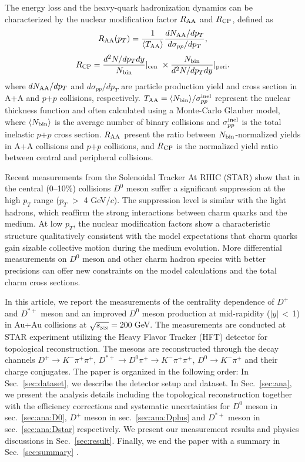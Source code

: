 \documentclass[%
 reprint,
 amsmath,amssymb,
 aps,
]{revtex4-1}
\begin{document}
The energy loss and the heavy-quark hadronization dynamics can be characterized by the nuclear modification factor $R_{\rm AA}$ and $R_{\rm CP}$, defined as
\begin{equation}
  R_{\rm AA}(p_T) = \frac{1}{\langle T_{\rm AA}\rangle} \frac{dN_{\rm AA}/dp_{T}}{d\sigma_{pp}/dp_{T}},
\label{equ:equation1}
\end{equation}
\begin{equation}
  R_{\rm CP} = \frac{d^2N/dp_{T}dy}{N_{\rm bin}} |_{\rm cen\ } \times \frac{N_{\rm bin}} {d^2N/dp_{T}dy} |_{\rm peri }.
\label{equ:equation2}
\end{equation}
where $dN_{\rm AA}/dp_T$ and $d\sigma_{pp}/dp_T$ are particle production yield and cross section in A+A and $p$+$p$ collisions, respectively. $T_{\rm AA}=\langle N_{\rm bin}\rangle/\sigma_{pp}^{\rm inel}$ represent the nuclear thickness function and often calculated using a Monte-Carlo Glauber model, where $\langle N_{\rm bin}\rangle$ is the average number of binary collisions and $\sigma_{pp}^{\rm inel}$ is the total inelastic $p$+$p$ cross section. $R_{\rm AA}$ present the ratio between $N_{\rm bin}$-normalized yields in A+A collisions and $p$+$p$ collisions, and $R_{\rm CP}$ is the normalized yield ratio between central and peripheral collisions.

Recent measurements from the Solenoidal Tracker At RHIC (STAR) show that in the central (0--10\%) collisions $D^0$ meson suffer a significant suppression at the high $p_T$ range ($p_T$ $>$ 4 GeV/$c$). The suppression level is similar with the light hadrons, which reaffirm the strong interactions between charm quarks and the medium. At low $p_T$, the nuclear modification factors show a characteristic structure qualitatively consistent with the model expectations that charm quarks gain sizable collective motion during the medium evolution. More differential measurements on $D^0$ meson and other charm hadron species with better precisions can offer new constraints on the model calculations and the total charm cross sections.

In this article, we report the measurements of the centrality dependence of $D^{+}$ and $D^{*+}$ meson and an improved $D^0$ meson production at mid-rapidity ($|y|$\,$<$\,1) in Au+Au collisions at $\sqrt{s_{_{\rm NN}}} = 200$\,GeV. The measurements are conducted at STAR experiment utilizing the Heavy Flavor Tracker (HFT) detector for topological reconstruction. The mesons are reconstructed through the decay channels $D^+\rightarrow K^-\pi^+\pi^+$, $D^{*+}\rightarrow D^{0}\pi^+\rightarrow K^-\pi^+\pi^+$, $D^0\rightarrow K^-\pi^+$ and their charge conjugates. The paper is organized in the following order: In Sec.~\ref{sec:dataset}, we describe the detector setup and dataset. In Sec.~\ref{sec:ana}, we present the analysis details including the topological reconstruction together with the efficiency corrections and systematic uncertainties for $D^0$ meson in sec.~\ref{sec:ana:D0}, $D^{+}$ meson in sec.~\ref{sec:ana:Dplus} and $D^{*+}$ meson in sec.~\ref{sec:ana:Dstar} respectively. We present our measurement results and physics discussions in Sec.~\ref{sec:result}. Finally, we end the paper with a summary in Sec.~\ref{sec:summary} .
\end{document}
